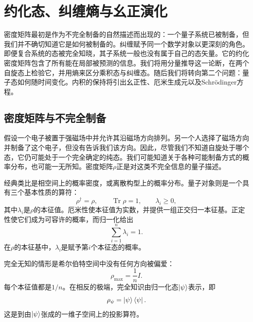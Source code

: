 \chapter{约化态、纠缠熵与幺正演化}

密度矩阵最初是作为不完全制备的自然描述而出现的：一个量子系统已被制备，但我们并不确切知道它是如何被制备的。纠缠赋予同一个数学对象以更深刻的角色。即便复合系统的态被完全知晓，其子系统一般也没有属于自己的态矢量。它的约化密度矩阵包含了所有能在局部被预测的信息。我们将用分量推导这一论断，在两个自旋态上检验它，并用熵来区分乘积态与纠缠态。随后我们将转向第二个问题：量子态如何随时间变化。内积的保持将引出幺正性、厄米生成元以及Schr\"odinger方程。

\section{密度矩阵与不完全制备}

假设一个电子被置于强磁场中并允许其沿磁场方向排列。另一个人选择了磁场方向并制备了这个电子，但没有告诉我们该方向。因此，尽管我们不知道自旋处于哪个态，它仍可能处于一个完全确定的纯态。我们可能知道关于各种可能制备方式的概率分布，也可能一无所知。密度矩阵\(\rho\)正是对这类不完全信息的量子描述。

经典类比是相空间上的概率密度，或离散构型上的概率分布。量子对象则是一个具有三个基本性质的算符：
\begin{equation}
\rho^\dagger=\rho,
\qquad
\operatorname{Tr}\rho=1,
\qquad
\lambda_i\geq 0,
\end{equation}
其中\(\lambda_i\)是\(\rho\)的本征值。厄米性使本征值为实数，并提供一组正交归一本征基。正定性使它们成为可容许的概率，而归一化给出
\begin{equation}
\sum_{i=1}^{n}\lambda_i=1.
\end{equation}
在\(\rho\)的本征基中，\(\lambda_i\)是赋予第\(i\)个本征态的概率。

完全无知的情形是希尔伯特空间中没有任何方向被偏爱：
\begin{equation}
\rho_{\mathrm{max}}=\frac{1}{n}I.
\end{equation}
每个本征值都是\(1/n\)。在相反的极端，完全知识由归一化态\(\left\lvert\psi\right\rangle\)表示，即
\begin{equation}
\rho_\psi=\left\lvert\psi\right\rangle\left\langle\psi\right\rvert.
\end{equation}
这是到由\(\left\lvert\psi\right\rangle\)张成的一维子空间上的投影算符。

\begin{classroomqa}
\end{classroomqa}

